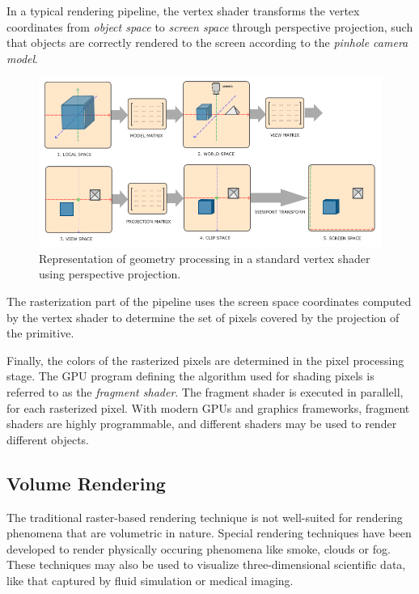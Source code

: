 \documentclass{article}
\begin{document}
In a typical rendering pipeline, the vertex shader transforms the vertex coordinates from \textit{object space} to \textit{screen space} through perspective projection, such that
objects are correctly rendered to the screen according to the \textit{pinhole camera model}.

\begin{figure}[tbh]
    \centering
    \includegraphics[width=1.0\textwidth]{images/coordinate_systems.png}
    \caption{Representation of geometry processing in a standard vertex shader using perspective projection\cite{learnopengl_figure}.}
    \label{fig:graphicsTransformations}
\end{figure}

The rasterization part of the pipeline uses the screen space coordinates computed by the vertex shader to
determine the set of pixels covered by the projection of the primitive. 

Finally, the colors of the rasterized pixels are determined in the pixel processing stage.
The GPU program defining the algorithm used for shading pixels is referred to as the \textit{fragment shader}.
The fragment shader is executed in parallell, for each rasterized pixel. With modern GPUs and graphics frameworks, fragment shaders are highly programmable, and different shaders may be used to render different objects.

\subsection{Volume Rendering}
The traditional raster-based rendering technique is not well-suited for rendering phenomena that are volumetric in nature.
Special rendering techniques have been developed to render physically occuring phenomena like smoke, clouds or fog. These techniques
may also be used to visualize three-dimensional scientific data, like that captured by fluid simulation or medical imaging.
\end{document}
